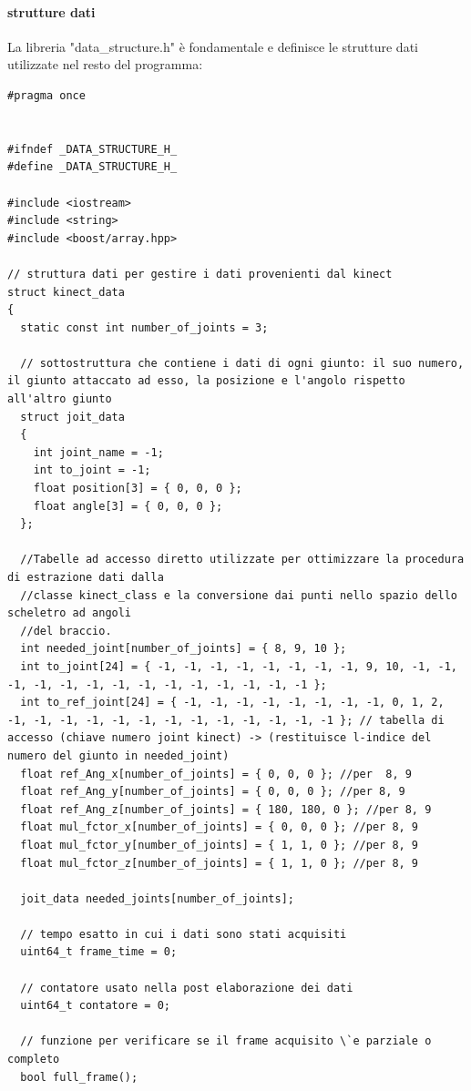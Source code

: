\documentclass[10pt,a4paper]{article}
\begin{document}
\paragraph{strutture dati}
La libreria "data\_structure.h" \`e fondamentale e definisce le strutture dati utilizzate nel resto del programma:
\begin{lstlisting}[style=mycpp, caption=data\_structure.h, captionpos=b]
#pragma once


#ifndef _DATA_STRUCTURE_H_
#define _DATA_STRUCTURE_H_

#include <iostream>
#include <string>
#include <boost/array.hpp>

// struttura dati per gestire i dati provenienti dal kinect
struct kinect_data
{
  static const int number_of_joints = 3;

  // sottostruttura che contiene i dati di ogni giunto: il suo numero, il giunto attaccato ad esso, la posizione e l'angolo rispetto all'altro giunto
  struct joit_data
  {
    int joint_name = -1;
    int to_joint = -1;
    float position[3] = { 0, 0, 0 };
    float angle[3] = { 0, 0, 0 };
  };

  //Tabelle ad accesso diretto utilizzate per ottimizzare la procedura di estrazione dati dalla
  //classe kinect_class e la conversione dai punti nello spazio dello scheletro ad angoli 
  //del braccio. 
  int needed_joint[number_of_joints] = { 8, 9, 10 };
  int to_joint[24] = { -1, -1, -1, -1, -1, -1, -1, -1, 9, 10, -1, -1, -1, -1, -1, -1, -1, -1, -1, -1, -1, -1, -1, -1 };
  int to_ref_joint[24] = { -1, -1, -1, -1, -1, -1, -1, -1, 0, 1, 2, -1, -1, -1, -1, -1, -1, -1, -1, -1, -1, -1, -1, -1 }; // tabella di accesso (chiave numero joint kinect) -> (restituisce l-indice del numero del giunto in needed_joint)    
  float ref_Ang_x[number_of_joints] = { 0, 0, 0 }; //per  8, 9
  float ref_Ang_y[number_of_joints] = { 0, 0, 0 }; //per 8, 9
  float ref_Ang_z[number_of_joints] = { 180, 180, 0 }; //per 8, 9
  float mul_fctor_x[number_of_joints] = { 0, 0, 0 }; //per 8, 9
  float mul_fctor_y[number_of_joints] = { 1, 1, 0 }; //per 8, 9
  float mul_fctor_z[number_of_joints] = { 1, 1, 0 }; //per 8, 9

  joit_data needed_joints[number_of_joints];

  // tempo esatto in cui i dati sono stati acquisiti
  uint64_t frame_time = 0;

  // contatore usato nella post elaborazione dei dati
  uint64_t contatore = 0;

  // funzione per verificare se il frame acquisito \`e parziale o completo 
  bool full_frame();


\end{lstlisting}
\end{document}
